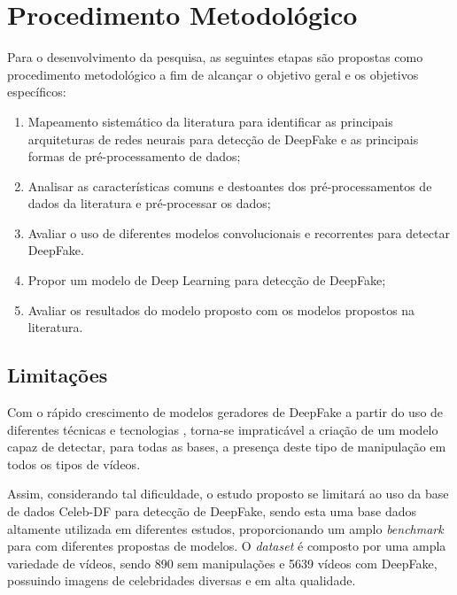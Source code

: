 \documentclass[12pt,a4paper, brazil]{article}
\begin{document}
\section{Procedimento Metodológico}
    \par Para o desenvolvimento da pesquisa, as seguintes etapas são propostas como procedimento metodológico a fim de alcançar o objetivo geral e os objetivos específicos:
    \begin{enumerate}
        \item Mapeamento sistemático da literatura para identificar as principais arquiteturas de redes neurais para detecção de DeepFake e as principais formas de pré-processamento de dados;
        \item Analisar as características comuns e destoantes dos pré-processamentos de dados da literatura e pré-processar os dados;
        \item Avaliar o uso de diferentes modelos convolucionais e recorrentes para detectar DeepFake.
        \item Propor um modelo de Deep Learning para detecção de DeepFake;
        \item Avaliar os resultados do modelo proposto com os modelos propostos na literatura.
        
    \end{enumerate}

    \subsection{Limitações}
    \par Com o rápido crescimento de modelos geradores de DeepFake a partir do uso de diferentes técnicas e tecnologias \cite{electronics13030585}, torna-se impraticável a criação de um modelo capaz de detectar, para todas as bases, a presença deste tipo de manipulação em todos os tipos de vídeos.
    \par Assim, considerando tal dificuldade, o estudo proposto se limitará ao uso da base de dados Celeb-DF \cite{li2020celebdflargescalechallengingdataset} para detecção de DeepFake, sendo esta uma base dados altamente utilizada em diferentes estudos, proporcionando um amplo \textit{benchmark} para com diferentes propostas de modelos. O \textit{dataset} é composto por uma ampla variedade de vídeos, sendo 890 sem manipulações e 5639 vídeos com DeepFake, possuindo imagens de celebridades diversas e em alta qualidade.

\printbibliography
\end{document}
